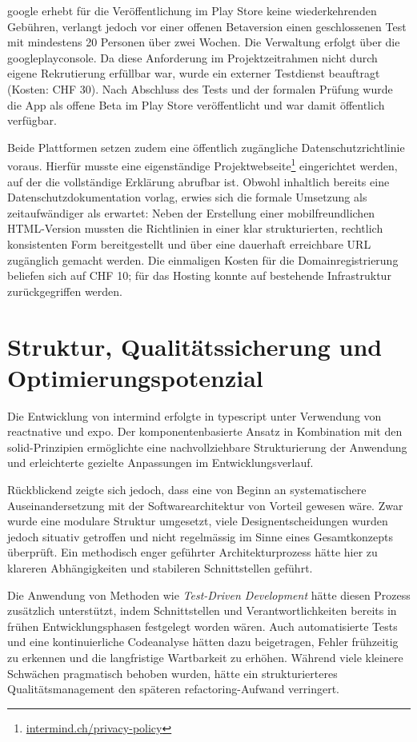 \gls{google} erhebt für die Veröffentlichung im Play Store keine wiederkehrenden Gebühren, verlangt jedoch vor einer offenen Betaversion einen geschlossenen Test mit mindestens 20 Personen über zwei Wochen. Die Verwaltung erfolgt über die \gls{googleplayconsole}. Da diese Anforderung im Projektzeitrahmen nicht durch eigene Rekrutierung erfüllbar war, wurde ein externer Testdienst beauftragt (Kosten: CHF 30). Nach Abschluss des Tests und der formalen Prüfung wurde die App als offene Beta im Play Store veröffentlicht und war damit öffentlich verfügbar.

Beide Plattformen setzen zudem eine öffentlich zugängliche Datenschutzrichtlinie voraus. Hierfür musste eine eigenständige Projektwebseite\footnote{\href{https://intermind.ch/privacy-policy.html?lang=de}{intermind.ch/privacy-policy}} eingerichtet werden, auf der die vollständige Erklärung abrufbar ist. Obwohl inhaltlich bereits eine Datenschutzdokumentation vorlag, erwies sich die formale Umsetzung als zeitaufwändiger als erwartet: Neben der Erstellung einer mobilfreundlichen HTML-Version mussten die Richtlinien in einer klar strukturierten, rechtlich konsistenten Form bereitgestellt und über eine dauerhaft erreichbare URL zugänglich gemacht werden. Die einmaligen Kosten für die Domainregistrierung beliefen sich auf CHF 10; für das Hosting konnte auf bestehende Infrastruktur zurückgegriffen werden.

\section{Struktur, Qualitätssicherung und Optimierungspotenzial}

Die Entwicklung von \gls{intermind} erfolgte in \gls{typescript} unter Verwendung von \gls{reactnative} und \gls{expo}. Der komponentenbasierte Ansatz in Kombination mit den \gls{solid}-Prinzipien ermöglichte eine nachvollziehbare Strukturierung der Anwendung und erleichterte gezielte Anpassungen im Entwicklungsverlauf.

Rückblickend zeigte sich jedoch, dass eine von Beginn an systematischere Auseinandersetzung mit der Softwarearchitektur von Vorteil gewesen wäre. Zwar wurde eine modulare Struktur umgesetzt, viele Designentscheidungen wurden jedoch situativ getroffen und nicht regelmässig im Sinne eines Gesamtkonzepts überprüft. Ein methodisch enger geführter Architekturprozess hätte hier zu klareren Abhängigkeiten und stabileren Schnittstellen geführt.

Die Anwendung von Methoden wie \emph{Test-Driven Development} hätte diesen Prozess zusätzlich unterstützt, indem Schnittstellen und Verantwortlichkeiten bereits in frühen Entwicklungsphasen festgelegt worden wären. Auch automatisierte Tests und eine kontinuierliche Codeanalyse hätten dazu beigetragen, Fehler frühzeitig zu erkennen und die langfristige Wartbarkeit zu erhöhen. Während viele kleinere Schwächen pragmatisch behoben wurden, hätte ein strukturierteres Qualitätsmanagement den späteren \gls{refactoring}-Aufwand verringert.

